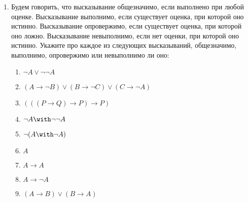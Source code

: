 \documentclass{article}
\begin{document}
\begin{enumerate}

    \item Будем говорить, что высказывание общезначимо, если выполнено при любой оценке.
        Высказывание выполнимо, если существует оценка, при которой оно истинно.
        Высказывание опровержимо, если существует оценка, при которой оно ложно.
        Высказывание невыполнимо, если нет оценки, при которой оно истинно.
         Укажите про каждое из следующих высказываний, общезначимо, выполнимо, опровержимо или невыполнимо ли оно:
    \begin{enumerate}
    \item $\neg A\vee\neg\neg A$
    \item $(A\rightarrow\neg B)\vee(B\rightarrow\neg C)\vee(C\rightarrow\neg A)$
    \item $(((P\rightarrow Q)\rightarrow P)\rightarrow P)$
    \item $\neg A \with \neg \neg A$
    \item $\neg (A \with \neg A)$
    \item $A$
    \item $A \rightarrow A$
    \item $A \rightarrow \neg A$
    \item $(A \rightarrow B) \vee (B \rightarrow A)$
    \end{enumerate}


\end{enumerate}
\end{document}
